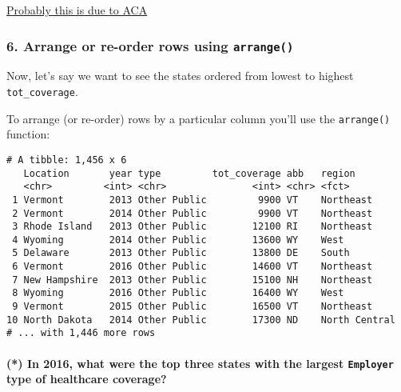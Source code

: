 \documentclass[]{article}
\newenvironment{Shaded}{\begin{snugshade}}{\end{snugshade}}
\newcommand{\KeywordTok}[1]{\textcolor[rgb]{0.13,0.29,0.53}{\textbf{#1}}}
\newcommand{\NormalTok}[1]{#1}
\newcommand{\OperatorTok}[1]{\textcolor[rgb]{0.81,0.36,0.00}{\textbf{#1}}}
\newcommand{\StringTok}[1]{\textcolor[rgb]{0.31,0.60,0.02}{#1}}
\let\oldparagraph\paragraph
\renewcommand{\paragraph}[1]{\oldparagraph{#1}\mbox{}}
\begin{document}
\href{https://en.wikipedia.org/wiki/Patient_Protection_and_Affordable_Care_Act}{Probably
this is due to ACA}

\hypertarget{arrange-or-re-order-rows-using-arrange}{%
\subsubsection{\texorpdfstring{6. Arrange or re-order rows using
\texttt{arrange()}}{6. Arrange or re-order rows using arrange()}}\label{arrange-or-re-order-rows-using-arrange}}

Now, let's say we want to see the states ordered from lowest to highest
\texttt{tot\_coverage}.

To arrange (or re-order) rows by a particular column you'll use the
\texttt{arrange()} function:

\begin{Shaded}
\end{Shaded}

\begin{verbatim}
# A tibble: 1,456 x 6
   Location       year type         tot_coverage abb   region       
   <chr>         <int> <chr>               <int> <chr> <fct>        
 1 Vermont        2013 Other Public         9900 VT    Northeast    
 2 Vermont        2014 Other Public         9900 VT    Northeast    
 3 Rhode Island   2013 Other Public        12100 RI    Northeast    
 4 Wyoming        2014 Other Public        13600 WY    West         
 5 Delaware       2013 Other Public        13800 DE    South        
 6 Vermont        2016 Other Public        14600 VT    Northeast    
 7 New Hampshire  2013 Other Public        15100 NH    Northeast    
 8 Wyoming        2016 Other Public        16400 WY    West         
 9 Vermont        2015 Other Public        16500 VT    Northeast    
10 North Dakota   2014 Other Public        17300 ND    North Central
# ... with 1,446 more rows
\end{verbatim}

\hypertarget{in-2016-what-were-the-top-three-states-with-the-largest-employer-type-of-healthcare-coverage}{%
\paragraph{\texorpdfstring{(*) In 2016, what were the top three states
with the largest \texttt{Employer} type of healthcare
coverage?}{(*) In 2016, what were the top three states with the largest Employer type of healthcare coverage?}}\label{in-2016-what-were-the-top-three-states-with-the-largest-employer-type-of-healthcare-coverage}}
\end{document}
